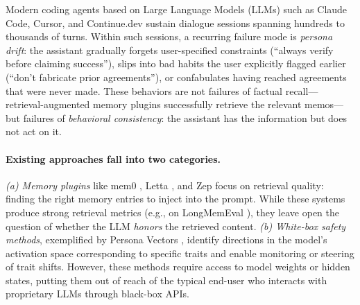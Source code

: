 
Modern coding agents based on Large Language Models (LLMs) such as
Claude Code, Cursor, and Continue.dev sustain dialogue sessions
spanning hundreds to thousands of turns. Within such sessions, a
recurring failure mode is \emph{persona drift}: the assistant
gradually forgets user-specified constraints (``always verify before
claiming success''), slips into bad habits the user explicitly
flagged earlier (``don't fabricate prior agreements''), or confabulates
having reached agreements that were never made. These behaviors are
not failures of factual recall---retrieval-augmented memory plugins
\citep{mem0,letta} successfully retrieve the relevant memos---but
failures of \emph{behavioral consistency}: the assistant has the
information but does not act on it.

\paragraph{Existing approaches fall into two categories.}
\textit{(a) Memory plugins} like mem0 \citep{mem0}, Letta
\citep{letta}, and Zep \citep{zep} focus on retrieval quality:
finding the right memory entries to inject into the prompt. While
these systems produce strong retrieval metrics (e.g., on
LongMemEval \citep{longmemeval2024}), they leave open the question
of whether the LLM \emph{honors} the retrieved content.
\textit{(b) White-box safety methods}, exemplified by
Persona Vectors \citep{personavectors2025}, identify directions in
the model's activation space corresponding to specific traits and
enable monitoring or steering of trait shifts. However, these
methods require access to model weights or hidden states, putting
them out of reach of the typical end-user who interacts with
proprietary LLMs through black-box APIs.

